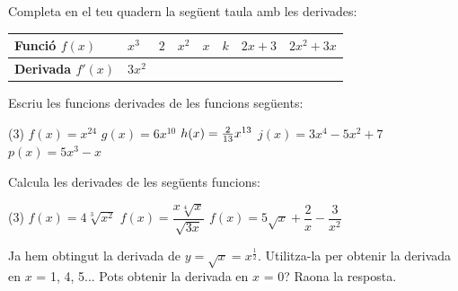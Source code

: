  
\begin{mylist}

\exer \spen Completa en el teu quadern la següent taula amb les derivades:


\begin{tabular}{|p{0.6in}|p{0.5in}|p{0.5in}|p{0.5in}|p{0.5in}|p{0.5in}|p{0.5in}|p{0.6in}|} \hline 
	\textbf{Funció $f(x)$} & $x^3$ & $ 2$ & $ x^2$ & $ x$ & $ k$ & $ 2x+ 3$ & $ 2 x^2+ 3x$ \\ \hline 
	\textbf{Derivada $f'(x)$} & $3x^2$ &  &   &   &   &  & \\ \hline 
\end{tabular}


\exer \mental  Escriu les funcions derivades de les funcions següents: 

\begin{tasks}(3)
	\task $f(x) = x^{24}$ \task  $g(x) = 6x^{10}$ \task  $h(x) = {2 \over 13} x^{13}$ \task  $j(x) = 3x^4 - 5x^2 + 7$ \task  $p(x) = 5x^3- x$
\end{tasks}

\answers{[$f'(x)=24 x^{23}$, $g'(x)=60 x^9$, $h'(x)=2 x^{12}$, $j'(x)=12 x^3 -10x$, $p'(x)=15x^2-1$]}

\exer Calcula les derivades de les següents funcions:


\begin{tasks}(3) 
	\task $f(x) = 4 \sqrt[3]{x^2}$ 
	\task $f(x)=\dfrac{x\sqrt[4]{x}}{\sqrt{3x}}$
	\task $f(x)=5\sqrt{x}+\dfrac{2}{x}- \dfrac{3}{x^2}$
\end{tasks}
\answers{[$f'(x)=\dfrac{8}{3}\dfrac{1}{\sqrt[3]{x}}$, $f'(x)=\frac{\sqrt{3}}{4\sqrt[4]{x}}$, $f'(x)=\dfrac{5}{2\sqrt{x}}-\dfrac{2}{x^2}+\dfrac{6}{x^3}$]}

\exer  Ja hem obtingut la derivada de $y=\sqrt{x} =x^{\frac{1}{2} } $. Utilitza-la per obtenir la derivada en \linebreak $x$ = 1, 4, 5... Pots obtenir la derivada en $x$ = 0? Raona la resposta.

\end{mylist}
